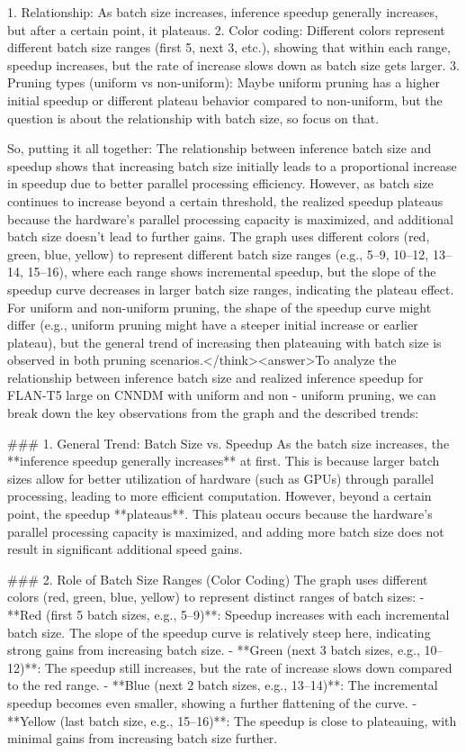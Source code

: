 1. Relationship: As batch size increases, inference speedup generally increases, but after a certain point, it plateaus.
2. Color coding: Different colors represent different batch size ranges (first 5, next 3, etc.), showing that within each range, speedup increases, but the rate of increase slows down as batch size gets larger.
3. Pruning types (uniform vs non-uniform): Maybe uniform pruning has a higher initial speedup or different plateau behavior compared to non-uniform, but the question is about the relationship with batch size, so focus on that.

So, putting it all together: The relationship between inference batch size and speedup shows that increasing batch size initially leads to a proportional increase in speedup due to better parallel processing efficiency. However, as batch size continues to increase beyond a certain threshold, the realized speedup plateaus because the hardware's parallel processing capacity is maximized, and additional batch size doesn't lead to further gains. The graph uses different colors (red, green, blue, yellow) to represent different batch size ranges (e.g., 5–9, 10–12, 13–14, 15–16), where each range shows incremental speedup, but the slope of the speedup curve decreases in larger batch size ranges, indicating the plateau effect. For uniform and non-uniform pruning, the shape of the speedup curve might differ (e.g., uniform pruning might have a steeper initial increase or earlier plateau), but the general trend of increasing then plateauing with batch size is observed in both pruning scenarios.</think><answer>To analyze the relationship between inference batch size and realized inference speedup for FLAN-T5 large on CNNDM with uniform and non - uniform pruning, we can break down the key observations from the graph and the described trends:  


### 1. General Trend: Batch Size vs. Speedup  
As the batch size increases, the **inference speedup generally increases** at first. This is because larger batch sizes allow for better utilization of hardware (such as GPUs) through parallel processing, leading to more efficient computation. However, beyond a certain point, the speedup **plateaus**. This plateau occurs because the hardware’s parallel processing capacity is maximized, and adding more batch size does not result in significant additional speed gains.  


### 2. Role of Batch Size Ranges (Color Coding)  
The graph uses different colors (red, green, blue, yellow) to represent distinct ranges of batch sizes:  
- **Red (first 5 batch sizes, e.g., 5–9)**: Speedup increases with each incremental batch size. The slope of the speedup curve is relatively steep here, indicating strong gains from increasing batch size.  
- **Green (next 3 batch sizes, e.g., 10–12)**: The speedup still increases, but the rate of increase slows down compared to the red range.  
- **Blue (next 2 batch sizes, e.g., 13–14)**: The incremental speedup becomes even smaller, showing a further flattening of the curve.  
- **Yellow (last batch size, e.g., 15–16)**: The speedup is close to plateauing, with minimal gains from increasing batch size further.  

